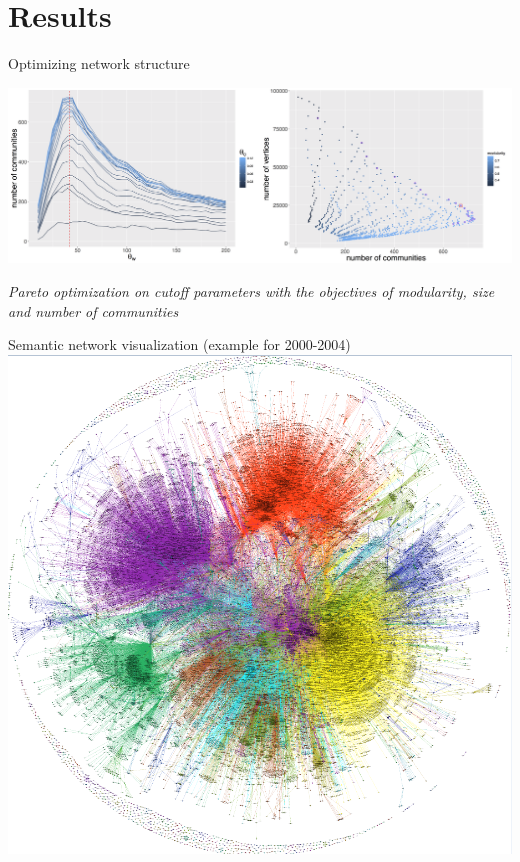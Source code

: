 \documentclass{beamer}
\begin{document}
\section{Results}
\begin{frame}{Optimizing network structure}
    
    \centering
    \includegraphics[width=\textwidth]{figures/Fig1.png}
    
    \medskip
    
    \textit{Pareto optimization on cutoff parameters with the objectives of modularity, size and number of communities}
    
\end{frame}

\begin{frame}{Semantic network visualization (example for 2000-2004)}
   \centering
    \includegraphics[height=0.85\textheight]{figures/Fig2.png}
    
\end{frame}
\end{document}
